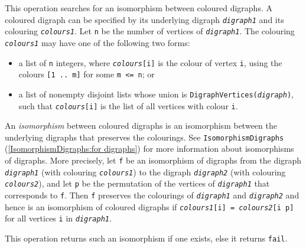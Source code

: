 \documentclass[a4paper,11pt]{report}
\begin{document}
{{{ This operation searches for an isomorphism between coloured digraphs. A
coloured digraph can be specified by its underlying digraph \mbox{\texttt{\mdseries\slshape digraph1}} and its colouring \mbox{\texttt{\mdseries\slshape colours1}}. Let \texttt{n} be the number of vertices of \mbox{\texttt{\mdseries\slshape digraph1}}. The colouring \mbox{\texttt{\mdseries\slshape colours1}} may have one of the following two forms: 
\begin{itemize}
\item  a list of \texttt{n} integers, where \mbox{\texttt{\mdseries\slshape colours}}\texttt{[i]} is the colour of vertex \texttt{i}, using the colours \texttt{[1 .. m]} for some \texttt{m {\textless}= n}; or 
\item  a list of non\texttt{}empty disjoint lists whose union is \texttt{DigraphVertices(\mbox{\texttt{\mdseries\slshape digraph}})}, such that \mbox{\texttt{\mdseries\slshape colours}}\texttt{[i]} is the list of all vertices with colour \texttt{i}. 
\end{itemize}
 An \emph{isomorphism} between coloured digraphs is an isomorphism between the underlying digraphs
that preserves the colourings. See \texttt{IsomorphismDigraphs} (\ref{IsomorphismDigraphs:for digraphs}) for more information about isomorphisms of digraphs. More precisely, let \texttt{f} be an isomorphism of digraphs from the digraph \mbox{\texttt{\mdseries\slshape digraph1}} (with colouring \mbox{\texttt{\mdseries\slshape colours1}}) to the digraph \mbox{\texttt{\mdseries\slshape digraph2}} (with colouring \mbox{\texttt{\mdseries\slshape colours2}}), and let \texttt{p} be the permutation of the vertices of \mbox{\texttt{\mdseries\slshape digraph1}} that corresponds to \texttt{f}. Then \texttt{f} preserves the colourings of \mbox{\texttt{\mdseries\slshape digraph1}} and \mbox{\texttt{\mdseries\slshape digraph2}} {\textendash} and hence is an isomorphism of coloured digraphs {\textendash}
if \texttt{\mbox{\texttt{\mdseries\slshape colours1}}[i] = \mbox{\texttt{\mdseries\slshape colours2}}[i \texttt{} p]} for all vertices \texttt{i} in \mbox{\texttt{\mdseries\slshape digraph1}}. 

 This operation returns such an isomorphism if one exists, else it returns \texttt{fail}. 

}}}
\end{document}

